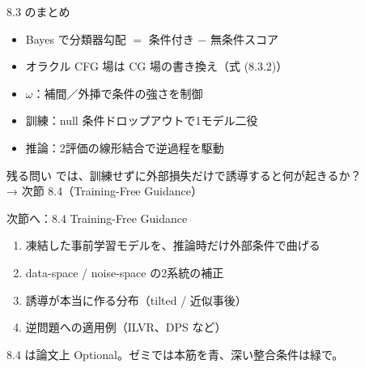 \asmain
\begin{frame}{8.3 のまとめ}
    \begin{itemize}
        \item Bayes で分類器勾配 $=$ 条件付き $-$ 無条件スコア
        \item オラクル CFG 場は CG 場の書き換え（式 (8.3.2)）
        \item $\omega$：補間／外挿で条件の強さを制御
        \item 訓練：null 条件ドロップアウトで1モデル二役
        \item 推論：2評価の線形結合で逆過程を駆動
    \end{itemize}
    \begin{block}{残る問い}
        では、訓練せずに外部損失だけで誘導すると何が起きるか？\\
        → 次節 8.4（Training-Free Guidance）
    \end{block}
\end{frame}
\asmain
\begin{frame}{次節へ：8.4 Training-Free Guidance}
    \begin{enumerate}
        \item 凍結した事前学習モデルを、推論時だけ外部条件で曲げる
        \item data-space / noise-space の2系統の補正
        \item 誘導が本当に作る分布（tilted / 近似事後）
        \item 逆問題への適用例（ILVR、DPS など）
    \end{enumerate}
    \vfill
    \footnotesize
    8.4 は論文上 Optional。ゼミでは本筋を青、深い整合条件は緑で。
\end{frame}
